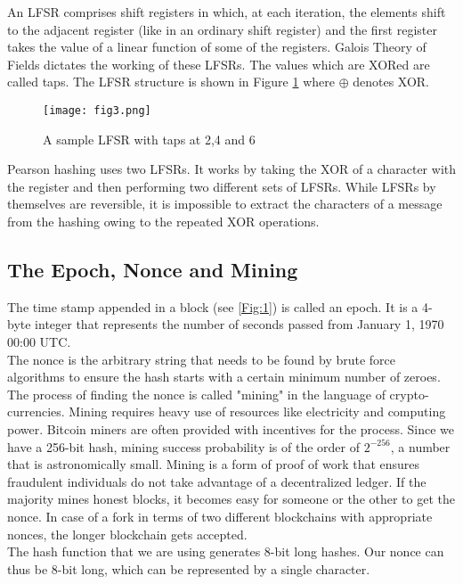 An LFSR comprises shift registers in which, at each iteration, the elements shift to the adjacent register (like in an ordinary shift register) and the first register takes the value of a linear function of some of the registers. Galois Theory of Fields dictates the working of these LFSRs. The values which are XORed are called taps. %
The LFSR structure is shown in Figure \ref{Fig:3}
where $\oplus$ denotes XOR.
\begin{figure}[!htb]
   \begin{minipage}{\textwidth}
     \centering
     \texttt{[image: fig3.png]}
     \caption{A sample LFSR with taps at 2,4 and 6}
     \label{Fig:3}
   \end{minipage}
\end{figure}

Pearson hashing uses two LFSRs. It works by taking the XOR of a character with the register and then performing two different sets of LFSRs. While LFSRs by themselves are reversible, it is impossible to extract the characters of a message from the hashing owing to the repeated XOR operations.
\subsection{The Epoch, Nonce and Mining}
The time stamp appended in a block (see \ref{Fig:1}) is called an epoch. It is a 4-byte integer that represents the number of seconds passed from January 1, 1970 00:00 UTC.\\
The nonce is the arbitrary string that needs to be found by brute force algorithms to ensure the hash starts with a certain minimum number of zeroes. The process of finding the nonce is called "mining" in the language of crypto-currencies. Mining requires heavy use of resources like electricity and computing power. Bitcoin miners are often provided with incentives for the process. Since we have a 256-bit hash, mining success probability is of the order of $2^{-256}$, a number that is astronomically small. Mining is a form of proof of work that ensures fraudulent individuals do not take advantage of a decentralized ledger. If the majority mines honest blocks, it becomes easy for someone or the other to get the nonce. In case of a fork in terms of two different blockchains with appropriate nonces, the longer blockchain gets accepted.\\
The hash function that we are using generates 8-bit long hashes. Our nonce can thus be 8-bit long, which can be represented by a single character.